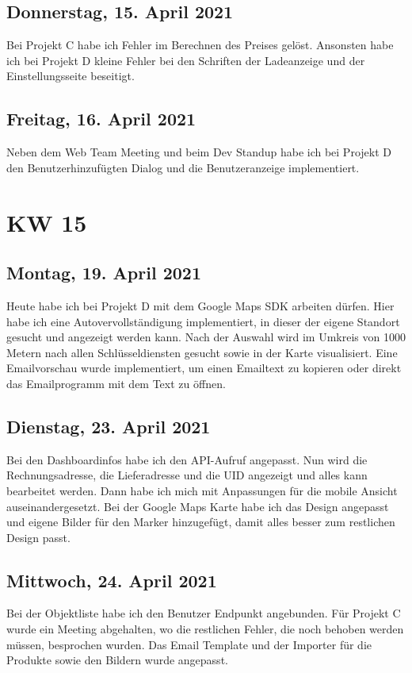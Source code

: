 \section{Donnerstag, 15. April 2021}
Bei Projekt C habe ich Fehler im Berechnen des Preises gelöst. Ansonsten habe ich bei Projekt D kleine Fehler bei den Schriften der Ladeanzeige und der Einstellungsseite beseitigt.

\section{Freitag, 16. April 2021}
Neben dem Web Team Meeting und beim Dev Standup habe ich bei Projekt D den Benutzerhinzufügten Dialog und die Benutzeranzeige implementiert.


\chapter{KW 15}

\section{Montag, 19. April 2021}
Heute habe ich bei Projekt D mit dem Google Maps SDK arbeiten dürfen. Hier habe ich eine Autovervollständigung implementiert, in dieser der eigene Standort gesucht und angezeigt werden kann. Nach der Auswahl wird im Umkreis von 1000 Metern nach allen Schlüsseldiensten gesucht sowie in der Karte visualisiert. Eine Emailvorschau wurde implementiert, um einen Emailtext zu kopieren oder direkt das Emailprogramm mit dem Text zu öffnen.

\section{Dienstag, 23. April 2021}
Bei den Dashboardinfos habe ich den API-Aufruf angepasst. Nun wird die Rechnungsadresse, die Lieferadresse und die UID angezeigt und alles kann bearbeitet werden. Dann habe ich mich mit Anpassungen für die mobile Ansicht auseinandergesetzt. Bei der Google Maps Karte habe ich das Design angepasst und eigene Bilder für den Marker hinzugefügt, damit alles besser zum restlichen Design passt.

\section{Mittwoch, 24. April 2021}
Bei der Objektliste habe ich den Benutzer Endpunkt angebunden. Für Projekt C wurde ein Meeting abgehalten, wo die restlichen Fehler, die noch behoben werden müssen, besprochen wurden. Das Email Template und der Importer für die Produkte sowie den Bildern wurde angepasst.

